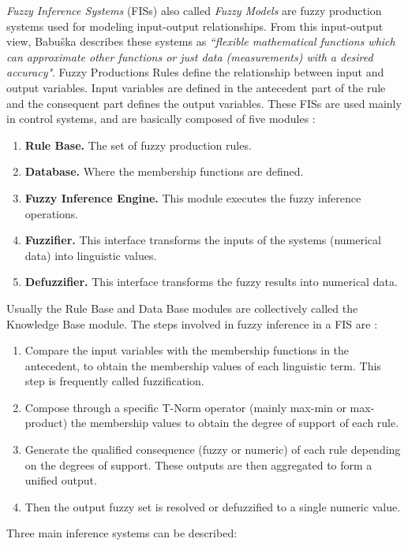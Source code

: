 \textit{Fuzzy Inference Systems} (FISs) also called 
\textit{Fuzzy Models} are fuzzy production systems used for modeling 
input-output relationships. From this input-output view, Babuŝka
 \cite{babuvska1996fuzzy} describes these systems as \textit{``flexible
mathematical functions which can approximate other functions or just
data (measurements) with a desired accuracy"}. Fuzzy Productions Rules
define the relationship between input and output variables. Input
variables are defined in the antecedent part of the rule and the
consequent part defines the output variables. These FISs are used
mainly in control systems, and are basically composed of five
modules \cite{babuvska1996fuzzy}:
\begin{enumerate}  
\item \textbf{Rule Base.} The set of fuzzy production rules.
\item \textbf{Database.} Where the membership functions are defined.
\item \textbf{Fuzzy Inference Engine.} This module executes the 
fuzzy inference operations.
\item \textbf{Fuzzifier.} This interface transforms the inputs 
of the systems (numerical data) into linguistic values.
\item \textbf{Defuzzifier.} This interface transforms the fuzzy 
results into numerical data.
\end{enumerate}
Usually the Rule Base and Data Base modules are collectively 
called the Knowledge Base module. The steps involved in fuzzy 
inference in a FIS are  \cite{dubois1980fuzzy}:
\begin{enumerate} 
\item Compare the input variables with the membership functions 
in the antecedent, to obtain the membership values of each 
linguistic term. This step is frequently called fuzzification.
\item Compose through a specific T-Norm operator (mainly max-min 
or max-product) the membership values to obtain the degree of 
support of each rule.
\item Generate the qualified consequence (fuzzy or numeric) of 
each rule depending on the degrees of support. These outputs 
are then aggregated to form a unified output.
\item Then the output fuzzy set is resolved or defuzzified 
to a single numeric value.
\end{enumerate} 
Three main inference systems can be described:

